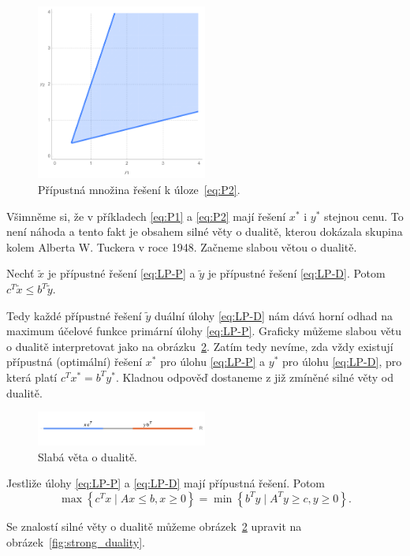 \begin{figure}[h!]
    \centering
    \includegraphics[width=0.5\textwidth]{img/ex2.png}   
    \caption{Přípustná množina řešení k úloze~\ref{eq:P2}.}
    \label{fig:ex2}
\end{figure}

Všimněme si, že v příkladech \ref{eq:P1} a \ref{eq:P2} mají řešení $x^*$ i $y^*$ stejnou cenu. To není náhoda a tento fakt je obsahem silné věty o dualitě, kterou dokázala skupina kolem Alberta W. Tuckera v roce 1948. Začneme slabou větou o dualitě.

\begin{vt}
    Nechť $\tilde{x}$ je přípustné řešení \ref{eq:LP-P} a $\tilde{y}$ je přípustné řešení \ref{eq:LP-D}. Potom $c^T \tilde{x} \leq b^T \tilde{y}$.
\end{vt}

Tedy každé přípustné řešení $\tilde{y}$ duální úlohy \ref{eq:LP-D} nám dává horní odhad na maximum účelové funkce primární úlohy \ref{eq:LP-P}. Graficky můžeme slabou větu o dualitě interpretovat jako na obrázku~\ref{fig:weak_duality}. Zatím tedy nevíme, zda vždy existují přípustná (optimální) řešení $x^*$ pro úlohu \ref{eq:LP-P} a $y^*$ pro úlohu \ref{eq:LP-D}, pro která platí $c^T x^* = b^T y^*$. Kladnou odpověď dostaneme z již zmíněné silné věty od dualitě.

\begin{figure}[h!]
    \centering
    \includegraphics[width=0.5\textwidth]{img/weak_duality.png}   
    \caption{Slabá věta o dualitě.}
    \label{fig:weak_duality}
\end{figure}

\begin{vt}
    Jestliže úlohy \ref{eq:LP-P} a \ref{eq:LP-D} mají přípustná řešení. Potom
    $$
        \max \left\{ c^T x \mid Ax \leq b, x \geq 0 \right\} = \min \left\{ b^T y \mid A^T y \geq c, y \geq 0 \right\}.
    $$ 
\end{vt}
Se znalostí silné věty o dualitě můžeme obrázek~\ref{fig:weak_duality} upravit na obrázek~\ref{fig:strong_duality}.

